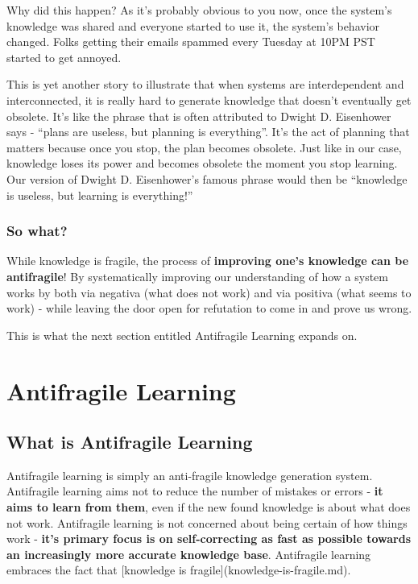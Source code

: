 \documentclass{article}
\begin{document}
Why did this happen? As it's probably obvious to you now, once the system's knowledge was shared and everyone started to use it, the system's behavior changed. Folks getting their emails spammed every Tuesday at 10PM PST started to get annoyed.

This is yet another story to illustrate that when systems are interdependent and interconnected, it is really hard to generate knowledge that doesn't eventually get obsolete. It's like the phrase that is often attributed to Dwight D. Eisenhower says - ``plans are useless, but planning is everything''. It's the act of planning that matters because once you stop, the plan becomes obsolete. Just like in our case, knowledge loses its power and becomes obsolete the moment you stop learning. Our version of Dwight D. Eisenhower's famous phrase would then be ``knowledge is useless, but learning is everything!''

\subsubsection{So what?}
While knowledge is fragile, the process of \textbf{improving one's knowledge can be antifragile}!
By systematically improving our understanding of how a system works by both via negativa (what does not work) and via positiva (what seems to work) - while leaving the door open for refutation to come in and prove us wrong.

This is what the next section entitled Antifragile Learning expands on.

\section{Antifragile Learning}

\subsection{What is Antifragile Learning}

Antifragile learning is simply an anti-fragile knowledge generation system. Antifragile learning aims not to reduce the number of mistakes or errors - \textbf{it aims to learn from them}, even if the new found knowledge is about what does not work. Antifragile learning is not concerned about being certain of how things work - \textbf{it's primary focus is on self-correcting as fast as possible towards an increasingly more accurate knowledge base}. Antifragile learning embraces the fact that [knowledge is fragile](knowledge-is-fragile.md).
\end{document}
